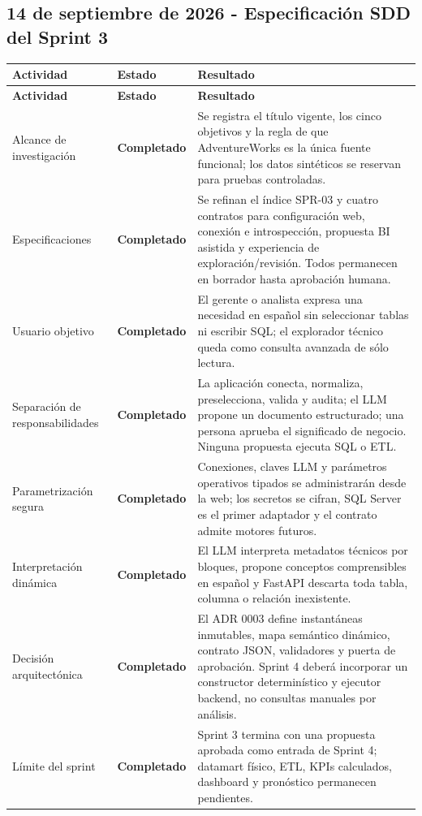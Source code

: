 \documentclass[11pt,letterpaper]{article}
\newcommand{\statusok}{\textcolor{deepgreen}{\textbf{Completado}}}
\begin{document}
\clearpage
\subsection{14 de septiembre de 2026 - Especificación SDD del Sprint 3}

\begin{longtable}{@{}p{}p{}p{}@{}}
  \toprule
  \textbf{Actividad} & \textbf{Estado} & \textbf{Resultado} \\
  \midrule
  \endfirsthead
  \toprule
  \textbf{Actividad} & \textbf{Estado} & \textbf{Resultado} \\
  \midrule
  \endhead
  Alcance de investigación & \statusok & Se registra el título vigente, los cinco objetivos y la regla de que AdventureWorks es la única fuente funcional; los datos sintéticos se reservan para pruebas controladas. \\
  Especificaciones & \statusok & Se refinan el índice SPR-03 y cuatro contratos para configuración web, conexión e introspección, propuesta BI asistida y experiencia de exploración/revisión. Todos permanecen en borrador hasta aprobación humana. \\
  Usuario objetivo & \statusok & El gerente o analista expresa una necesidad en español sin seleccionar tablas ni escribir SQL; el explorador técnico queda como consulta avanzada de sólo lectura. \\
  Separación de responsabilidades & \statusok & La aplicación conecta, normaliza, preselecciona, valida y audita; el LLM propone un documento estructurado; una persona aprueba el significado de negocio. Ninguna propuesta ejecuta SQL o ETL. \\
  Parametrización segura & \statusok & Conexiones, claves LLM y parámetros operativos tipados se administrarán desde la web; los secretos se cifran, SQL Server es el primer adaptador y el contrato admite motores futuros. \\
  Interpretación dinámica & \statusok & El LLM interpreta metadatos técnicos por bloques, propone conceptos comprensibles en español y FastAPI descarta toda tabla, columna o relación inexistente. \\
  Decisión arquitectónica & \statusok & El ADR 0003 define instantáneas inmutables, mapa semántico dinámico, contrato JSON, validadores y puerta de aprobación. Sprint 4 deberá incorporar un constructor determinístico y ejecutor backend, no consultas manuales por análisis. \\
  Límite del sprint & \statusok & Sprint 3 termina con una propuesta aprobada como entrada de Sprint 4; datamart físico, ETL, KPIs calculados, dashboard y pronóstico permanecen pendientes. \\

\end{longtable}
\end{document}

